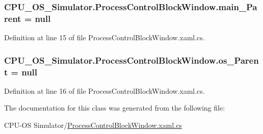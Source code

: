 \subsubsection[{main\+\_\+\+Parent}]{ C\+P\+U\+\_\+\+O\+S\+\_\+\+Simulator.\+Process\+Control\+Block\+Window.\+main\+\_\+\+Parent = {\bf null}\hspace{0.3cm}{\ttfamily [private]}}\label{class_c_p_u___o_s___simulator_1_1_process_control_block_window_a928d5159874200e6ca0fad00913d65e5}


Definition at line 15 of file Process\+Control\+Block\+Window.\+xaml.\+cs.

\hypertarget{class_c_p_u___o_s___simulator_1_1_process_control_block_window_acc4b72c5370a2bcda85b16e0801ce3d9}{}
\subsubsection[{os\+\_\+\+Parent}]{ C\+P\+U\+\_\+\+O\+S\+\_\+\+Simulator.\+Process\+Control\+Block\+Window.\+os\+\_\+\+Parent = {\bf null}\hspace{0.3cm}{\ttfamily [private]}}\label{class_c_p_u___o_s___simulator_1_1_process_control_block_window_acc4b72c5370a2bcda85b16e0801ce3d9}


Definition at line 16 of file Process\+Control\+Block\+Window.\+xaml.\+cs.



The documentation for this class was generated from the following file\+:\begin{DoxyCompactItemize}
\item 
C\+P\+U-\/\+O\+S Simulator/\hyperlink{_process_control_block_window_8xaml_8cs}{Process\+Control\+Block\+Window.\+xaml.\+cs}\end{DoxyCompactItemize}
